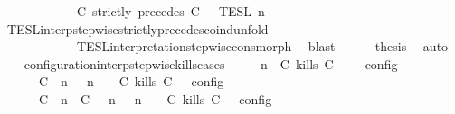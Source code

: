 \begin{isabellebody}
\ \ \ \ \ \ \ \ \ \ {\isacharequal}\ {\isasymlbrakk}{\isasymlbrakk}\ {\isacharparenleft}C\ strictly\ precedes\ C\ {\isacharhash}\ {\isasymPsi}\ {\isasymrbrakk}{\isasymrbrakk}\isactrlsub T\isactrlsub E\isactrlsub S\isactrlsub L\isactrlbsup {\isasymge}\ n\isactrlesup {\isacartoucheclose}\isanewline
\ \ \ \ \ \ \isamarkupfalse%
\ TESL{\isacharunderscore}interp{\isacharunderscore}stepwise{\isacharunderscore}strictly{\isacharunderscore}precedes{\isacharunderscore}coind{\isacharunderscore}unfold\isanewline
\ \ \ \ \ \ \ \ \ \ \ \ TESL{\isacharunderscore}interpretation{\isacharunderscore}stepwise{\isacharunderscore}cons{\isacharunderscore}morph\ \isamarkupfalse%
\ blast\isanewline
\ \ \ \ \isamarkupfalse%
\ {\isacharquery}thesis\ \isamarkupfalse%
\ auto\isanewline
\ \ \isamarkupfalse%
\isanewline
{}\isamarkupfalse%
%
\endisatagproof
{\isafoldproof}%
%
\isadelimproof
\isanewline
%
\endisadelimproof
\isanewline
{}\isamarkupfalse%
\ configuration{\isacharunderscore}interp{\isacharunderscore}stepwise{\isacharunderscore}kills{\isacharunderscore}cases{\isacharcolon}\isanewline
\ \ \ {\isacartoucheopen}{\isasymlbrakk}\ {\isasymGamma}{\isacharcomma}\ n\ {\isasymTurnstile}\ {\isacharparenleft}{\isacharparenleft}C\ kills\ C\ {\isacharhash}\ {\isasymPsi}{\isacharparenright}\ {\isasymtriangleright}\ {\isasymPhi}\ {\isasymrbrakk}\isactrlsub c\isactrlsub o\isactrlsub n\isactrlsub f\isactrlsub i\isactrlsub g\isanewline
\ \ \ \ {\isacharequal}\ {\isasymlbrakk}\ {\isacharparenleft}{\isacharparenleft}C\ {\isasymnot}{\isasymUp}\ n{\isacharparenright}\ {\isacharhash}\ {\isasymGamma}{\isacharparenright}{\isacharcomma}\ n\ {\isasymTurnstile}\ {\isasymPsi}\ {\isasymtriangleright}\ {\isacharparenleft}{\isacharparenleft}C\ kills\ C\ {\isacharhash}\ {\isasymPhi}{\isacharparenright}\ {\isasymrbrakk}\isactrlsub c\isactrlsub o\isactrlsub n\isactrlsub f\isactrlsub i\isactrlsub g\isanewline
\ \ \ \ {\isasymunion}\ {\isasymlbrakk}\ {\isacharparenleft}{\isacharparenleft}C\ {\isasymUp}\ n{\isacharparenright}\ {\isacharhash}\ {\isacharparenleft}C\ {\isasymnot}{\isasymUp}\ {\isasymge}\ n{\isacharparenright}\ {\isacharhash}\ {\isasymGamma}{\isacharparenright}{\isacharcomma}\ n\ {\isasymTurnstile}\ {\isasymPsi}\ {\isasymtriangleright}\ {\isacharparenleft}{\isacharparenleft}C\ kills\ C\ {\isacharhash}\ {\isasymPhi}{\isacharparenright}\ {\isasymrbrakk}\isactrlsub c\isactrlsub o\isactrlsub n\isactrlsub f\isactrlsub i\isactrlsub g{\isacartoucheclose}\isanewline

\end{isabellebody}
